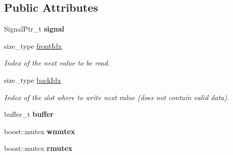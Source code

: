 \subsection*{Public Attributes}
\begin{DoxyCompactItemize}
\item 
Signal\+Ptr\+\_\+t {\bfseries signal}\hypertarget{structdynamic__graph_1_1internal_1_1BindedSignal_aa0b8c4e3dcea8585de50697b892ea0a4}{}\label{structdynamic__graph_1_1internal_1_1BindedSignal_aa0b8c4e3dcea8585de50697b892ea0a4}

\item 
size\+\_\+type \hyperlink{structdynamic__graph_1_1internal_1_1BindedSignal_af90b4e3d1f26e7525f51e0903c17a37f}{front\+Idx}\hypertarget{structdynamic__graph_1_1internal_1_1BindedSignal_af90b4e3d1f26e7525f51e0903c17a37f}{}\label{structdynamic__graph_1_1internal_1_1BindedSignal_af90b4e3d1f26e7525f51e0903c17a37f}

\begin{DoxyCompactList}\small\item\em Index of the next value to be read. \end{DoxyCompactList}\item 
size\+\_\+type \hyperlink{structdynamic__graph_1_1internal_1_1BindedSignal_a93b1cf4373c6271937f535a68334c523}{back\+Idx}\hypertarget{structdynamic__graph_1_1internal_1_1BindedSignal_a93b1cf4373c6271937f535a68334c523}{}\label{structdynamic__graph_1_1internal_1_1BindedSignal_a93b1cf4373c6271937f535a68334c523}

\begin{DoxyCompactList}\small\item\em Index of the slot where to write next value (does not contain valid data). \end{DoxyCompactList}\item 
buffer\+\_\+t {\bfseries buffer}\hypertarget{structdynamic__graph_1_1internal_1_1BindedSignal_aefa6f66d4def9aa5353335c035c1d716}{}\label{structdynamic__graph_1_1internal_1_1BindedSignal_aefa6f66d4def9aa5353335c035c1d716}

\item 
boost\+::mutex {\bfseries wmutex}\hypertarget{structdynamic__graph_1_1internal_1_1BindedSignal_ad3b9957dafb9684643caacbdc2739c38}{}\label{structdynamic__graph_1_1internal_1_1BindedSignal_ad3b9957dafb9684643caacbdc2739c38}

\item 
boost\+::mutex {\bfseries rmutex}\hypertarget{structdynamic__graph_1_1internal_1_1BindedSignal_a25a7206b3a9904d4cccd226bd885e232}{}\label{structdynamic__graph_1_1internal_1_1BindedSignal_a25a7206b3a9904d4cccd226bd885e232}


\end{DoxyCompactItemize}
